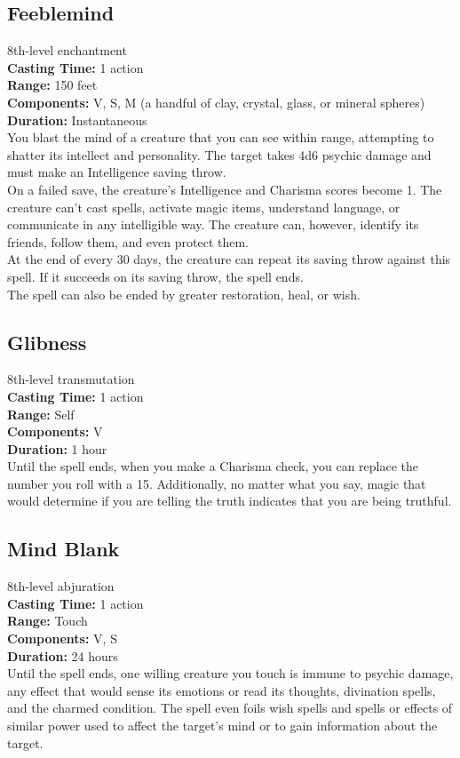 \documentclass[11pt, A4paper, english]{article}
\begin{document}
		\subsection{Feeblemind}
8th-level enchantment \\
\textbf{Casting Time:} 1 action \\
\textbf{Range:} 150 feet \\
\textbf{Components:} V, S, M (a handful of clay, crystal, glass, or mineral spheres) \\
\textbf{Duration:} Instantaneous \\
You blast the mind of a creature that you can see within range, attempting to shatter its intellect and personality. The target takes 4d6 psychic damage and must make an Intelligence saving throw. \\
On a failed save, the creature’s Intelligence and Charisma scores become 1. The creature can’t cast spells, activate magic items, understand language, or communicate in any intelligible way. The creature can, however, identify its friends, follow them, and even protect them. \\
At the end of every 30 days, the creature can repeat its saving throw against this spell. If it succeeds on its saving throw, the spell ends. \\
The spell can also be ended by greater restoration, heal, or wish.

		\subsection{Glibness}
8th-level transmutation \\
\textbf{Casting Time:} 1 action \\
\textbf{Range:} Self \\
\textbf{Components:} V \\
\textbf{Duration:} 1 hour \\
Until the spell ends, when you make a Charisma check, you can replace the number you roll with a 15. Additionally, no matter what you say, magic that would determine if you are telling the truth indicates that you are being truthful.

		\subsection{Mind Blank}
8th-level abjuration \\
\textbf{Casting Time:} 1 action \\
\textbf{Range:} Touch \\
\textbf{Components:} V, S \\
\textbf{Duration:} 24 hours \\
Until the spell ends, one willing creature you touch is immune to psychic damage, any effect that would sense its emotions or read its thoughts, divination spells, and the charmed condition. The spell even foils wish spells and spells or effects of similar power used to affect the target’s mind or to gain information about the target.
\end{document}
